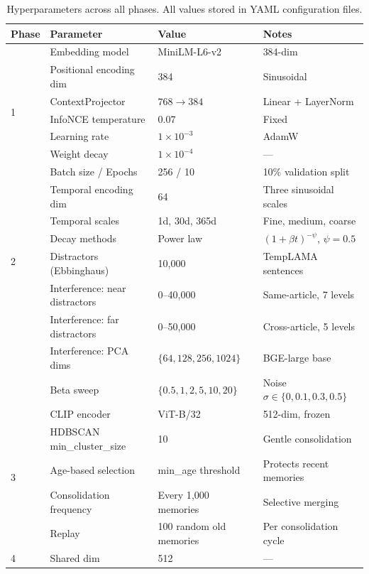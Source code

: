 \documentclass[11pt]{article}
\begin{document}
\begin{table}[!ht]
\centering
\caption{Hyperparameters across all phases. All values stored in YAML configuration files.}
\label{tab:hyperparams}
\small
\begin{tabular}{@{}llll@{}}
\toprule
\textbf{Phase} & \textbf{Parameter} & \textbf{Value} & \textbf{Notes} \\
\midrule
\multirow{7}{*}{1} & Embedding model & MiniLM-L6-v2 & 384-dim \\
 & Positional encoding dim & 384 & Sinusoidal \\
 & ContextProjector & $768 \to 384$ & Linear + LayerNorm \\
 & InfoNCE temperature & 0.07 & Fixed \\
 & Learning rate & $1 \times 10^{-3}$ & AdamW \\
 & Weight decay & $1 \times 10^{-4}$ & --- \\
 & Batch size / Epochs & 256 / 10 & 10\% validation split \\
\midrule
\multirow{6}{*}{2} & Temporal encoding dim & 64 & Three sinusoidal scales \\
 & Temporal scales & 1d, 30d, 365d & Fine, medium, coarse \\
 & Decay methods & Power law & $(1+\beta t)^{-\psi}$, $\psi = 0.5$ \\
 & Distractors (Ebbinghaus) & 10{,}000 & TempLAMA sentences \\
 & Interference: near distractors & 0--40{,}000 & Same-article, 7 levels \\
 & Interference: far distractors & 0--50{,}000 & Cross-article, 5 levels \\
 & Interference: PCA dims & $\{64, 128, 256, 1024\}$ & BGE-large base \\
 & Beta sweep & $\{0.5, 1, 2, 5, 10, 20\}$ & Noise $\sigma \in \{0, 0.1, 0.3, 0.5\}$ \\
\midrule
\multirow{5}{*}{3} & CLIP encoder & ViT-B/32 & 512-dim, frozen \\
 & HDBSCAN min\_cluster\_size & 10 & Gentle consolidation \\
 & Age-based selection & min\_age threshold & Protects recent memories \\
 & Consolidation frequency & Every 1{,}000 memories & Selective merging \\
 & Replay & 100 random old memories & Per consolidation cycle \\
\midrule
\multirow{5}{*}{4} & Shared dim & 512 & --- \\

\end{tabular}
\end{table}
\end{document}
